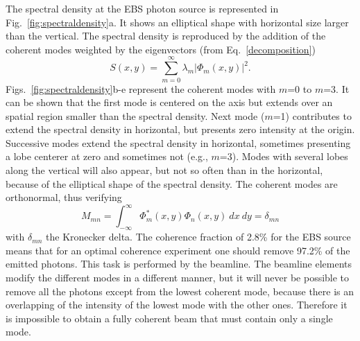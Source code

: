 \documentclass{iucr}              %
\begin{document}
The spectral density at the EBS photon source is represented in Fig.~\ref{fig:spectraldensity}a. It shows an elliptical shape with horizontal size larger than the vertical.  The spectral density is reproduced by the addition of the coherent modes weighted by the eigenvectors (from Eq.~\ref{decomposition})
\begin{equation}
S(x,y) = \sum_{m=0}^{\infty} \lambda_m |\Phi_m(x,y)|^2.
\end{equation}
Figs.~\ref{fig:spectraldensity}b-e represent the coherent modes with $m$=0 to $m$=3. It can be shown that the first mode is centered on the axis but extends over an spatial region smaller than the spectral density. Next mode ($m$=1) contributes to extend the spectral density in horizontal, but presents zero intensity at the origin. Successive modes extend  the spectral density in horizontal, sometimes presenting a lobe centerer at zero and sometimes not (e.g., $m$=3). Modes with several lobes along the vertical will also appear, but not so often than in the horizontal, because of the elliptical shape of the spectral density. The coherent modes are orthonormal, thus verifying 
\begin{equation}\label{eq:mode normalization}
M_{mn} = \int_{-\infty}^{\infty} \Phi^*_m(x,y) \Phi_n(x,y)~dx~dy = \delta_{mn}
\end{equation}
with $\delta_{mn}$ the Kronecker delta. The coherence fraction of 2.8\% for the EBS source means that for an optimal coherence experiment one should remove 97.2\% of the emitted photons. This task is performed by the beamline. The beamline elements modify the different modes in a different manner, but it will never be possible to remove all the photons except from the lowest coherent mode, because there is an overlapping of the intensity of the lowest mode with the other ones. Therefore it is impossible to obtain a fully coherent beam that must contain only a single mode. 
\end{document}
